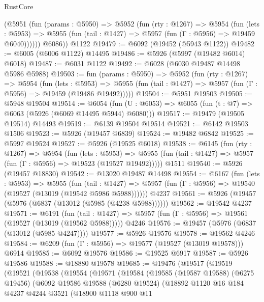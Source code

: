 \begin{lexlean}{RustCore}
\begin{coremodule}
        (@5951
          (fun (params : @5950) =>
          @5952
            (fun (rty : @1267) =>
            @5954
              (fun (lets : @5953) =>
              @5955 (fun (tail : @1427) => @5957 (fun (Γ : @5956) => @19459 @6040))))))
        @6086))
    @1122
@19479 := @6092 (@19452 (@5943 @1122))
@19482 := @6005 (@6006 @1122) @14495
@19486 := @5926 (@5997 (@19482 @6014) @6018)
@19487 := @6031 @1122
@19492 := @6028 (@6030 @19487 @14498 @5986 @5988)
@19503 := fun (params : @5950) =>
  @5952
    (fun (rty : @1267) =>
    @5954
      (fun (lets : @5953) =>
      @5955 (fun (tail : @1427) => @5957 (fun (Γ : @5956) => @19459 (@19486 @19492)))))
@19504 := @5951 @19503
@19505 := @5948 @19504
@19514 := @6054
    (fun (U : @6053) => @6055 (fun (t : @7) => @6063 (@5926 (@6069 @14495 @5944) @6080)))
@19517 := @19479 (@19505 @19514) @14493
@19519 := @6139 @19504 @19514
@19521 := @6142 @19503 @1506
@19523 := @5926 (@19457 @6839)
@19524 := @19482 @6842
@19525 := @5997 @19524
@19527 := @5926 (@19525 @6018)
@19538 := @6145
    (fun (rty : @1267) =>
    @5954
      (fun (lets : @5953) =>
      @5955 (fun (tail : @1427) => @5957 (fun (Γ : @5956) => @19523 (@19527 @19492)))))
    @1511
@19540 := @5926 (@19457 @18830)
@19542 := @13020 @19487 @14498
@19554 := @6167
    (fun (lets : @5953) =>
    @5955
      (fun (tail : @1427) =>
      @5957 (fun (Γ : @5956) => @19540 (@19527 (@13019 (@19542 @5986 @5988))))))
    @4237
@19561 := @5926 (@19457 (@5976 (@6837 (@13012 (@5985 (@4238 @5988))))))
@19562 := @19542 @4237
@19571 := @6191
    (fun (tail : @1427) => @5957 (fun (Γ : @5956) => @19561 (@19527 (@13019 (@19562 @5988)))))
    @4246
@19576 := @19457 (@5976 (@6837 (@13012 (@5985 @4247))))
@19577 := @5926 @19576
@19578 := @19562 @4246
@19584 := @6209 (fun (Γ : @5956) => @19577 (@19527 (@13019 @19578))) @6914
@19585 := @6092 @19576
@19586 := @19525 @6917
@19587 := @5926 @19586
@19588 := @18880 @19578
@19685 := @19476
    (@19517
      (@19519
        (@19521
          (@19538
            (@19554
              (@19571
                (@19584
                  (@19585
                    (@19587 @19588)
                    (@6275 @19456)
                    (@6092
                      @19586
                      @19588
                      (@6280 @19524)
                      (@18892
                        @1120
                        @16
                        @184
                        @4237
                        @4244
                        @3521
                        (@18900
                          @1118
                          @900
                          @11

\end{coremodule}
\end{lexlean}
